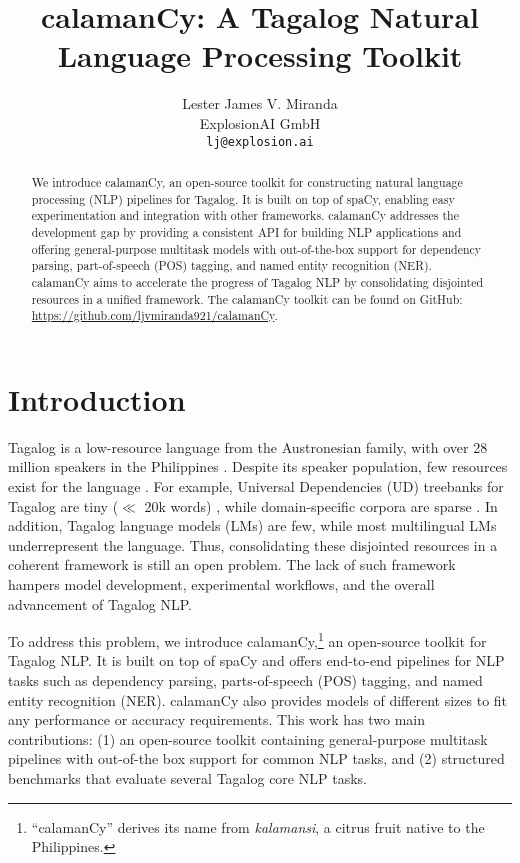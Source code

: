 \documentclass[11pt]{article}
\title{calamanCy: A Tagalog Natural Language Processing Toolkit}
\author{Lester James V. Miranda \\
  ExplosionAI GmbH \\
  \texttt{lj@explosion.ai}}
\begin{document}
\maketitle
\begin{abstract}
  We introduce calamanCy, an open-source toolkit for constructing natural language processing (NLP) pipelines for Tagalog.
  It is built on top of spaCy, enabling easy experimentation and integration with other frameworks.  
  calamanCy addresses the development gap by providing a consistent API for building NLP applications and offering general-purpose multitask models with out-of-the-box support for dependency parsing, part-of-speech (POS) tagging, and named entity recognition (NER).
  calamanCy aims to accelerate the progress of Tagalog NLP by consolidating disjointed resources in a unified framework.
  The calamanCy toolkit can be found on GitHub: \url{https://github.com/ljvmiranda921/calamanCy}.
\end{abstract}

\section{Introduction}

Tagalog is a low-resource language from the Austronesian family, with over 28 million speakers in the Philippines \citep{Lewis2009EthnologueL}.
Despite its speaker population, few resources exist for the language \citep{Cruz2021ImprovingLL}. 
For example, Universal Dependencies (UD) treebanks for Tagalog are tiny ($\ll$ 20k words) \citep{Samson2018TRG,Aquino2020ParsingIT}, 
while domain-specific corpora are sparse \citep{Cabasag2016HatespeechIP,Livelo2018IntelligentDI}. 
In addition, Tagalog language models (LMs) \citep{Cruz2021ImprovingLL,Jiang2021PretrainedLM} are few, while most multilingual LMs \citep{Conneau2019UnsupervisedCR,Devlin2019BERTPO} underrepresent the language.
Thus, consolidating these disjointed resources in a coherent framework is still an open problem.
The lack of such framework hampers model development, experimental workflows, and the overall advancement of Tagalog NLP.

To address this problem, we introduce calamanCy,\footnote[1]{
  ``calamanCy'' derives its name from \textit{kalamansi}, a citrus fruit native to the Philippines.}
an open-source toolkit for Tagalog NLP. 
It is built on top of spaCy \citep{Honnibal2020Spacy} and offers end-to-end pipelines for NLP tasks such as dependency parsing, parts-of-speech (POS) tagging, and named entity recognition (NER). 
calamanCy also provides models of different sizes to fit any performance or accuracy requirements.
This work has two main contributions: (1) an open-source toolkit containing general-purpose multitask pipelines with out-of-the box support for common NLP tasks, and (2) structured benchmarks that evaluate several Tagalog core NLP tasks.
\end{document}
